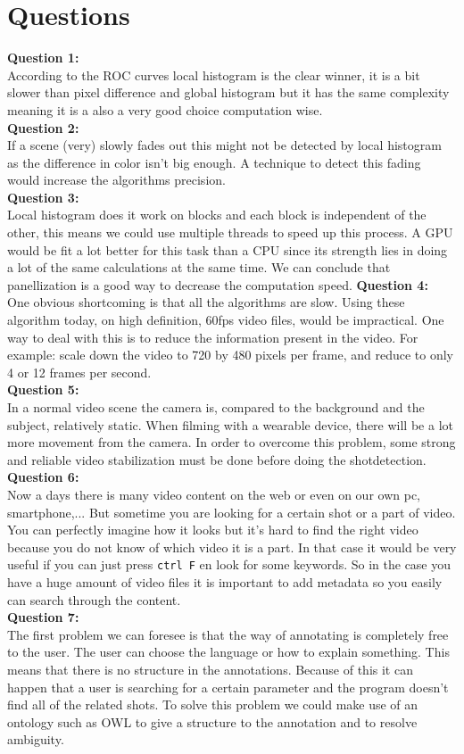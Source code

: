 \documentclass[a4paper,11pt,oneside]{article}
\begin{document}
\section{Questions}
\textbf{Question 1:}\\
According to the ROC curves local histogram is the clear winner, it is a bit slower than pixel difference and global histogram but it has the same complexity meaning it is a also a very good choice computation wise.\\
\textbf{Question 2:}\\
If a scene (very) slowly fades out this might not be detected by local histogram as the difference in color isn't big enough. A technique to detect this fading would increase the algorithms precision.\\
\textbf{Question 3:}\\
Local histogram does it work on blocks and each block is independent of the other, this means we could use multiple threads to speed up this process. A GPU would be fit a lot better for this task than a CPU since its strength lies in doing a lot of the same calculations at the same time. We can conclude that panellization is a good way to decrease the computation speed.
\textbf{Question 4:}\\
One obvious shortcoming is that all the algorithms are slow. Using these algorithm today, on high definition, 60fps video files, would be impractical. One way to deal with this is to reduce the information present in the video. For example: scale down the video to 720 by 480 pixels per frame, and reduce to only 4 or 12 frames per second.\\
\textbf{Question 5:}\\
In a normal video scene the camera is, compared to the background and the subject, relatively static. When filming with a wearable device, there will be a lot more movement from the camera. In order to overcome this problem, some strong and reliable video stabilization must be done before doing the shotdetection. \\
\textbf{Question 6:}\\
Now a days there is many video content on the web or even on our own pc, smartphone,... But sometime you are looking for a certain shot or a part of video. You can perfectly imagine how it looks but it's hard to find the right video because you do not know of which video it is a part. In that case it would be very useful if you can just press \verb!ctrl F! en look for some keywords. So in the case you have a huge amount of video files it is important to add metadata so you easily can search through the content.\\
\textbf{Question 7:}\\
The first problem we can foresee is that the way of annotating is completely free to the user. The user can choose the language or how to explain something. This means that there is no structure in the annotations. Because of this it can happen that a user is searching for a certain parameter and the program doesn't find all of the related shots. To solve this problem we could make use of an ontology such as OWL to give a structure to the annotation and to resolve ambiguity.
\end{document}
